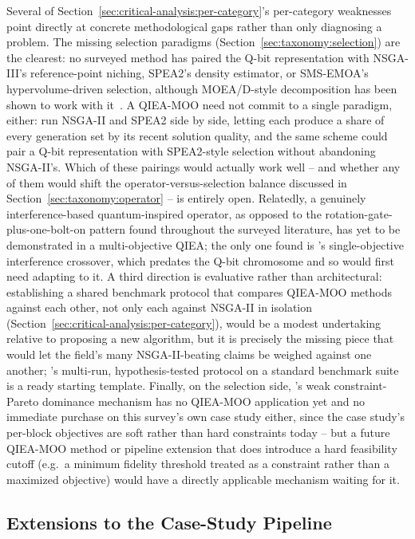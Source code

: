 Several of Section~\ref{sec:critical-analysis:per-category}'s
per-category weaknesses point directly at concrete methodological gaps
rather than only diagnosing a problem. The missing selection paradigms
(Section~\ref{sec:taxonomy:selection}) are the clearest: no surveyed
method has paired the Q-bit representation with NSGA-III's
reference-point niching, SPEA2's density estimator, or SMS-EMOA's
hypervolume-driven selection, although MOEA/D-style decomposition has
been shown to work with it~\citep{deng2024moqead}. A QIEA-MOO need not
commit to a single paradigm, either: \citet{florea2023superposition}
run NSGA-II and SPEA2 side by side, letting each produce a share of
every generation set by its recent solution quality, and the same
scheme could pair a Q-bit representation with SPEA2-style selection
without abandoning NSGA-II's. Which of
these pairings would actually work well -- and whether any of them
would shift the operator-versus-selection balance discussed in
Section~\ref{sec:taxonomy:operator} -- is entirely open. Relatedly, a
genuinely interference-based quantum-inspired operator, as opposed to
the rotation-gate-plus-one-bolt-on pattern found throughout the
surveyed literature, has yet to be demonstrated in a multi-objective
QIEA; the only one found is \citet{narayanan1996qiga}'s
single-objective interference crossover, which predates the Q-bit
chromosome and so would first need adapting to it. A third
direction is evaluative rather than architectural: establishing a
shared benchmark protocol that compares QIEA-MOO methods against each
other, not only each against NSGA-II in isolation
(Section~\ref{sec:critical-analysis:per-category}), would be a modest
undertaking relative to proposing a new algorithm, but it is precisely
the missing piece that would let the field's many NSGA-II-beating
claims be weighed against one another; \citet{olvera2023continuous}'s
multi-run, hypothesis-tested protocol on a standard benchmark suite is
a ready starting template. Finally, on the selection side,
\citet{guo2025weakconstraintpareto}'s weak constraint-Pareto
dominance mechanism has no QIEA-MOO application yet and no immediate
purchase on this survey's own case study either, since the case
study's per-block objectives are soft rather than hard constraints today -- but a future QIEA-MOO
method or pipeline extension that does introduce a hard feasibility
cutoff (e.g.\ a minimum fidelity threshold treated as a constraint
rather than a maximized objective) would have a directly applicable
mechanism waiting for it.

\subsection{Extensions to the Case-Study Pipeline}
\label{sec:open-challenges:pipeline}

